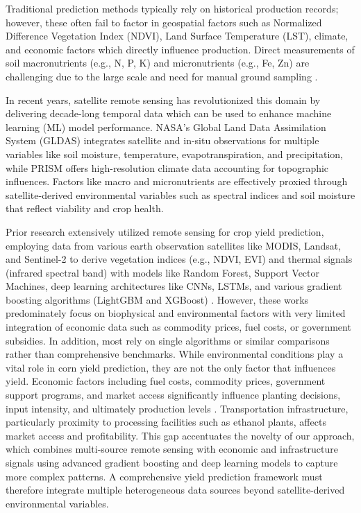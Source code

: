 \documentclass[10pt,twocolumn]{article}
\begin{document}
Traditional prediction methods typically rely on historical production records; however, these often fail to factor in geospatial factors such as Normalized Difference Vegetation Index (NDVI), Land Surface Temperature (LST), climate, and economic factors which directly influence production. Direct measurements of soil macronutrients (e.g., N, P, K) and micronutrients (e.g., Fe, Zn) are challenging due to the large scale and need for manual ground sampling \cite{kayad2019,ji2022}.

In recent years, satellite remote sensing has revolutionized this domain by delivering decade-long temporal data which can be used to enhance machine learning (ML) model performance. NASA's Global Land Data Assimilation System (GLDAS) integrates satellite and in-situ observations for multiple variables like soil moisture, temperature, evapotranspiration, and precipitation, while PRISM offers high-resolution climate data accounting for topographic influences. Factors like macro and micronutrients are effectively proxied through satellite-derived environmental variables such as spectral indices and soil moisture that reflect viability and crop health.

Prior research extensively utilized remote sensing for crop yield prediction, employing data from various earth observation satellites like MODIS, Landsat, and Sentinel-2 to derive vegetation indices (e.g., NDVI, EVI) and thermal signals (infrared spectral band) with models like Random Forest, Support Vector Machines, deep learning architectures like CNNs, LSTMs, and various gradient boosting algorithms (LightGBM and XGBoost) \cite{kayad2019,ji2022,desloires2024,nevavuori2020,prasetyo2024,chen2016,ke2017,shahhosseini2021,roy2025}. However, these works predominately focus on biophysical and environmental factors with very limited integration of economic data such as commodity prices, fuel costs, or government subsidies. In addition, most rely on single algorithms or similar comparisons rather than comprehensive benchmarks. While environmental conditions play a vital role in corn yield prediction, they are not the only factor that influences yield. Economic factors including fuel costs, commodity prices, government support programs, and market access significantly influence planting decisions, input intensity, and ultimately production levels \cite{usda2023}. Transportation infrastructure, particularly proximity to processing facilities such as ethanol plants, affects market access and profitability. This gap accentuates the novelty of our approach, which combines multi-source remote sensing with economic and infrastructure signals using advanced gradient boosting and deep learning models to capture more complex patterns. A comprehensive yield prediction framework must therefore integrate multiple heterogeneous data sources beyond satellite-derived environmental variables.
\end{document}
